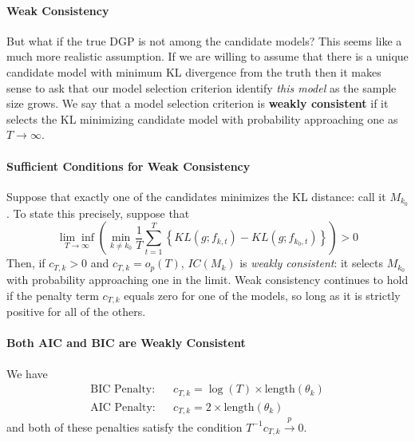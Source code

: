 \paragraph{Weak Consistency} But what if the true DGP is not among the candidate models? This seems like a much more realistic assumption. If we are willing to assume that there is a unique candidate model with minimum KL divergence from the truth then it makes sense to ask that our model selection criterion identify \emph{this model} as the sample size grows. We say that a model selection criterion is \textbf{weakly consistent} if it selects the KL minimizing candidate model with probability approaching one as $T\rightarrow \infty$.


\paragraph{Sufficient Conditions for Weak Consistency}
Suppose that exactly one of the candidates minimizes the KL distance: call it $M_{k_0}$. To state this precisely, suppose that
	$$\underset{T\rightarrow \infty}{\lim\inf}\left(\underset{k \neq k_0}{\min} \frac{1}{T}\sum_{t = 1}^T \left\{ KL(g; f_{k,t}) - KL(g;f_{k_0,t}) \right\} \right) > 0$$
Then, if $c_{T,k}> 0$ and $c_{T,k} = o_p(T)$, $IC(M_k)$ is \emph{weakly consistent}: it selects $M_{k_0}$ with probability approaching one in the limit. Weak consistency continues to hold if the penalty term $c_{T,k}$ equals zero for one of the models, so long as it is strictly positive for all of the others.

\paragraph{Both AIC and BIC are Weakly Consistent}
We have
	\begin{eqnarray*}
		\mbox{BIC Penalty:}&& c_{T,k} = \log(T) \times \mbox{length}(\theta_k)\\
		\mbox{AIC Penalty:} && c_{T,k} = 2\times \mbox{length}(\theta_k)
	\end{eqnarray*}
and both of these penalties satisfy the condition $T^{-1}c_{T,k} \overset{p}{\rightarrow} 0$.

